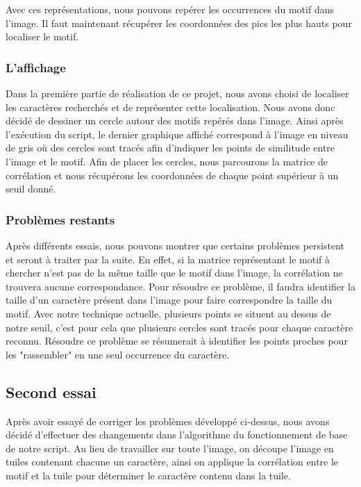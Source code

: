 \documentclass[a4paper,12pt,titlepage]{report}
\begin{document}
		Avec ces représentations, nous pouvons repérer les occurrences du motif dans l'image. Il faut maintenant récupérer les coordonnées des pics les plus hauts pour localiser le motif.
		\subsubsection{L'affichage}
		Dans la première partie de réalisation de ce projet, nous avons choisi de localiser les caractères recherchés et de représenter cette localisation. Nous avons donc décidé de dessiner un cercle autour des motifs repérés dans l'image.
		Ainsi après l'exécution du script, le dernier graphique affiché correspond à l'image en niveau de gris où des cercles sont tracés afin d'indiquer les points de similitude entre l'image et le motif.
		Afin de placer les cercles, nous parcourons la matrice de corrélation et nous récupérons les coordonnées de chaque point supérieur à un seuil donné. 

		\subsubsection{Problèmes restants}
		Après différents essais, nous pouvons montrer que certains problèmes persistent et seront à traiter par la suite.
		En effet, si la matrice représentant le motif à chercher n'est pas de la même taille que le motif dans l'image, la corrélation ne trouvera aucune correspondance. Pour résoudre ce problème, il faudra identifier la taille d'un caractère présent dans l'image pour faire correspondre la taille du motif.
		Avec notre technique actuelle, plusieurs points se situent au dessus de notre seuil, c'est pour cela que plusieurs cercles sont tracés pour chaque caractère reconnu. Résoudre ce problème se résumerait à identifier les points proches pour les "rassembler" en une seul occurrence du caractère.
	\subsection{Second essai}
	\label{essai2}
	Après avoir essayé de corriger les problèmes développé ci-dessus, nous avons décidé d'effectuer des changements dans l’algorithme du fonctionnement de base de notre script. Au lieu de travailler sur toute l'image, on découpe l'image en tuiles contenant chacune un caractère, ainsi on applique la corrélation entre le motif et la tuile pour déterminer le caractère contenu dans la tuile.
	
\end{document}
